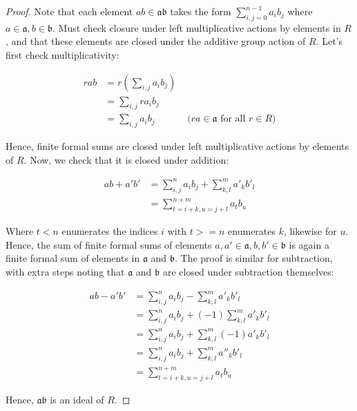 \documentclass[12pt]{article}
\newcommand{\ia}{\mathfrak{a}}
\newcommand{\ib}{\mathfrak{b}}
\begin{document}
\begin{proof}

Note that each element $ab \in \ia\ib$ takes the form $\sum_{i,j = 0}^{n-1} a_i b_j$ where $a \in \ia, b\in \ib$. Must check closure under left multiplicative actions by elements in $R$, and that these elements are closed under the additive group action of $R$. Let's first check multiplicativity: 

\begin{equation*}
	\begin{aligned}
	rab & = r(\sum_{i,j} a_i b_j) \\
	      & = \sum_{i,j} ra_i b_j \\
	      & = \sum_{i,j} a_i b_j   & \text{ ($ra \in \ia$ for all $r \in R$)}
	\end{aligned}
\end{equation*}

Hence, finite formal sums are closed under left multiplicative actions by elements of $R$. Now, we check that it is closed under addition: 

\begin{equation*}
	\begin{aligned}
	ab + a'b' & = \sum_{i,j}^n a_i b_j + \sum_{k,l}^m a'_k b'_l\\
	      & = \sum_{t = i + k, u = j + l}^{n + m} a_t b_u
	\end{aligned}
\end{equation*}

Where $t < n$ enumerates the indices $i$ with $t >= n$ enumerates $k$, likewise for $u$. Hence, the sum of finite formal sums of elements $a, a' \in \ia, b, b' \in \ib$ is again a finite formal sum of elements in $\ia$ and $\ib$. The proof is similar for subtraction, with extra steps noting that $\ia$ and $\ib$ are closed under subtraction themselves:

\begin{equation*}
	\begin{aligned}
	 ab - a'b' & = \sum_{i,j}^n a_i b_j - \sum_{k,l}^m a'_k b'_l \\
	   	      & = \sum_{i,j}^n a_i b_j + (-1)\sum_{k,l}^m a'_k b'_l \\
		      & = \sum_{i,j}^n a_i b_j + \sum_{k,l}^m (-1)a'_k b'_l  \\
		      & = \sum_{i,j}^n a_i b_j + \sum_{k,l}^m a''_k b'_l \\
		      & = \sum_{t = i + k, u = j + l}^{n + m} a_t b_u
	\end{aligned}
\end{equation*}

Hence, $\ia\ib$ is an ideal of $R$.
\end{proof}
\end{document}
